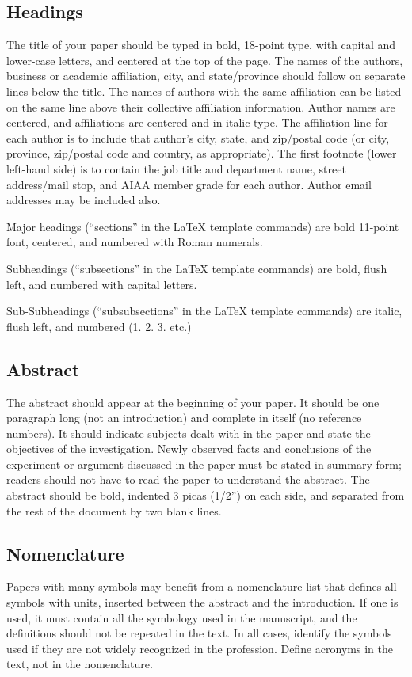 \subsection{Headings}
The title of your paper should be typed in bold, 18-point type, with capital and lower-case letters, and centered at the top of the page. The names of the authors, business or academic affiliation, city, and state/province should follow on separate lines below the title. The names of authors with the same affiliation can be listed on the same line above their collective affiliation information. Author names are centered, and affiliations are centered and in italic type. The affiliation line for each author is to include that author’s city, state, and zip/postal code (or city, province, zip/postal code and country, as appropriate). The first footnote (lower left-hand side) is to contain the job title and department name, street address/mail stop, and AIAA member grade for each author. Author email addresses may be included also.

Major headings (``sections'' in the \LaTeX{} template commands) are bold 11-point font, centered, and numbered with Roman numerals.

Subheadings (``subsections'' in the \LaTeX{} template commands) are bold, flush left, and numbered with capital letters. 

Sub-Subheadings (``subsubsections'' in the \LaTeX{} template commands) are italic, flush left, and numbered (1. 2. 3. etc.)


\subsection{Abstract}
The abstract should appear at the beginning of your paper. It should be one paragraph long (not an introduction) and complete in itself (no reference numbers). It should indicate subjects dealt with in the paper and state the objectives of the investigation. Newly observed facts and conclusions of the experiment or argument discussed in the paper must be stated in summary form; readers should not have to read the paper to understand the abstract. The abstract should be bold, indented 3 picas (1/2'') on each side, and separated from the rest of the document by two blank lines.

\subsection{Nomenclature}
Papers with many symbols may benefit from a nomenclature list that defines all symbols with units, inserted between the abstract and the introduction. If one is used, it must contain all the symbology used in the manuscript, and the definitions should not be repeated in the text. In all cases, identify the symbols used if they are not widely recognized in the profession. Define acronyms in the text, not in the nomenclature.


